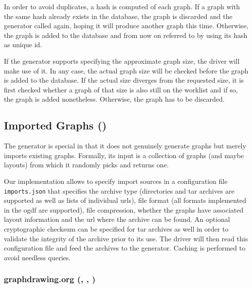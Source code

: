 \documentclass{graphstudy}
\begin{document}
In order to avoid duplicates, a hash is computed of each graph.  If a graph with the same hash already exists in the
database, the graph is discarded and the generator called again, hoping it will produce another graph this time.
Otherwise, the graph is added to the database and from now on referred to by using its hash as unique \acs{id}.

If the generator supports specifying the approximate graph size, the driver will make use of it.  In any case, the
actual graph size will be checked before the graph is added to the database.  If the actual size diverges from the
requested size, it is first checked whether a graph of that size is also still on the worklist and if so, the graph is
added nonetheless.  Otherwise, the graph has to be discarded.

\subsection{Imported Graphs ()}
\label{sec:import}

The  generator is special in that it does not genuinely generate graphs but merely imports existing graphs.
Formally, its input is a collection of graphs (and maybe layouts) from which it randomly picks and returns one.

Our implementation allows to specify import sources in a configuration file \verb`imports.json` that specifies the
archive type (directories and \acs{tar} archives are supported as well as lists of individual \acsp{url}), file format
(all formats implemented in the \acs*{ogdf} are supported), file compression, whether the graphs have associated layout
information and the \acs{url} where the archive can be found.  An optional cryptographic checksum can be specified for
\acs{tar} archives as well in order to validate the integrity of the archive prior to its use.  The driver will then
read this configuration file and feed the archives to the  generator.  Caching is performed to avoid
needless queries.

\subsubsection{graphdrawing.org (, , )}
\end{document}
